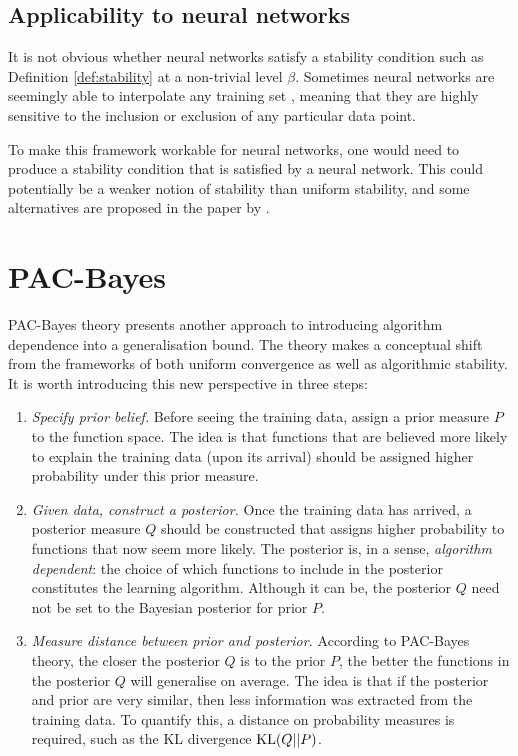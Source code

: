 \begin{refsection}
\subsection{Applicability to neural networks}
It is not obvious whether neural networks satisfy a stability condition such as Definition \ref{def:stability} at a non-trivial level $\beta$. Sometimes neural networks are seemingly able to interpolate any training set \citep{Zhang2017UnderstandingDL}, meaning that they are highly sensitive to the inclusion or exclusion of any particular data point.

To make this framework workable for neural networks, one would need to produce a stability condition that is satisfied by a neural network. This could potentially be a weaker notion of stability than uniform stability, and some alternatives are proposed in the paper by \citet{stability}.

\section{PAC-Bayes}

PAC-Bayes theory presents another approach to introducing algorithm dependence into a generalisation bound. The theory makes a conceptual shift from the frameworks of both uniform convergence as well as algorithmic stability. It is worth introducing this new perspective in three steps:

\begin{enumerate}[label=Step \arabic*:, leftmargin=*, font=\sffamily]
    \item \textit{Specify prior belief.} Before seeing the training data, assign a prior measure $P$ to the function space. The idea is that functions that are believed more likely to explain the training data (upon its arrival) should be assigned higher probability under this prior measure.
    \item \textit{Given data, construct a posterior.} Once the training data has arrived, a posterior measure $Q$ should be constructed that assigns higher probability to functions that now seem more likely. The posterior is, in a sense, \textit{algorithm dependent}: the choice of which functions to include in the posterior constitutes the learning algorithm. Although it can be, the posterior $Q$ need not be set to the Bayesian posterior for prior $P$.
    \item \textit{Measure distance between prior and posterior.} According to PAC-Bayes theory, the closer the posterior $Q$ is to the prior $P$, the better the functions in the posterior $Q$ will generalise on average. The idea is that if the posterior and prior are very similar, then less information was extracted from the training data. To quantify this, a distance on probability measures is required, such as the KL divergence $\mathrm{KL}(Q||P)$.
\end{enumerate}


\end{refsection}
